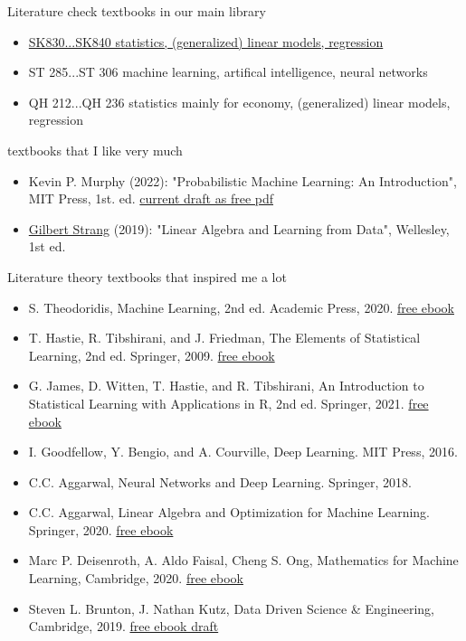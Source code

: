 \documentclass[mathserif, aspectratio=43]{intbeamer}
\begin{document}
\begin{frame}{Literature}
  check textbooks in our main library
  \begin{itemize}
    \item \href{https://find.ub.uni-rostock.de/sk830}{SK830...SK840 statistics, (generalized) linear models, regression}
    \item ST 285...ST 306 machine learning, artifical intelligence, neural networks
    \item QH 212...QH 236 statistics mainly for economy, (generalized) linear models, regression
  \end{itemize}
  textbooks that I like very much
  \begin{itemize}
    \item Kevin P. Murphy (2022): "Probabilistic Machine Learning: An Introduction", MIT Press, 1st. ed.
    \href{https://probml.github.io/pml-book/book1.html}{current draft as free pdf}
    \item \href{https://math.mit.edu/~gs/}{Gilbert Strang} (2019): "Linear Algebra and Learning from Data", Wellesley, 1st ed.
  \end{itemize}
\end{frame}

\begin{frame}{Literature}
  theory textbooks that inspired me a lot
  \begin{itemize}
    \item S. Theodoridis, Machine Learning, 2nd ed. Academic Press, 2020.
    \href{https://www.sciencedirect.com/book/9780128188033/machine-learning}{free ebook}
    \item T. Hastie, R. Tibshirani, and J. Friedman, The Elements of Statistical Learning, 2nd ed. Springer, 2009.
    \href{https://hastie.su.domains/ElemStatLearn/}{free ebook}
    \item G. James, D. Witten, T. Hastie, and R. Tibshirani, An Introduction to Statistical Learning with Applications in R, 2nd ed. Springer, 2021. \href{https://www.statlearning.com/}{free ebook}
    \item I. Goodfellow, Y. Bengio, and A. Courville, Deep Learning. MIT Press, 2016.
    \item C.C. Aggarwal, Neural Networks and Deep Learning. Springer, 2018.
    \item C.C. Aggarwal, Linear Algebra and Optimization for Machine Learning. Springer, 2020. \href{https://link.springer.com/book/10.1007/978-3-030-40344-7}{free ebook}
    \item Marc P. Deisenroth, A. Aldo Faisal, Cheng S. Ong, Mathematics for Machine Learning, Cambridge, 2020. \href{https://mml-book.github.io/book/mml-book.pdf}{free ebook}
    \item Steven L. Brunton, J. Nathan Kutz, Data Driven Science \& Engineering, Cambridge, 2019. \href{http://www.databookuw.com/databook.pdf}{free ebook draft}
  \end{itemize}
\end{frame}
\end{document}
